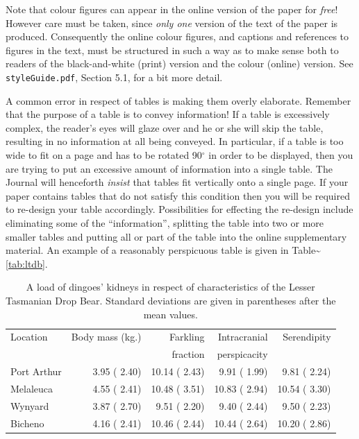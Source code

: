 \documentclass[
  times,
  doublespace]{anzsauth}
\begin{document}
Note that colour figures can appear in the online version of the paper
for \emph{free}! However care must be taken, since \emph{only one}
version of the text of the paper is produced. Consequently the online
colour figures, and captions and references to figures in the text, must
be structured in such a way as to make sense both to readers of the
black-and-white (print) version and the colour (online) version. See
\texttt{styleGuide.pdf}, Section 5.1, for a bit more detail.

A common error in respect of tables is making them overly elaborate.
Remember that the purpose of a table is to convey information! If a
table is excessively complex, the reader's eyes will glaze over and he
or she will skip the table, resulting in no information at all being
conveyed. In particular, if a table is too wide to fit on a page and has
to be rotated 90\(^\circ\) in order to be displayed, then you are trying
to put an excessive amount of information into a single table. The
Journal will henceforth \emph{insist} that tables fit vertically onto a
single page. If your paper contains tables that do not satisfy this
condition then you will be required to re-design your table accordingly.
Possibilities for effecting the re-design include eliminating some of
the ``information'', splitting the table into two or more smaller tables
and putting all or part of the table into the online supplementary
material. An example of a reasonably perspicuous table is given in
Table\textasciitilde{}\ref{tab:ltdb}.

\begin{table}[htp]
\caption{
A load of dingoes' kidneys in respect
of characteristics of the Lesser Tasmanian Drop Bear.  Standard
deviations are given in parentheses after the mean values.}
\centering
\begin{tabular}{|l|r|r|r|r|} \hline
Location & Body mass (kg.) & Farkling & Intracranial & Serendipity \\ 
         &                 & fraction & perspicacity &             \\ \hline
  Port Arthur &  3.95 ( 2.40) & 10.14 ( 2.43) &  9.91 ( 1.99) &  9.81 ( 2.24) \\ 
  Melaleuca   &  4.55 ( 2.41) & 10.48 ( 3.51) & 10.83 ( 2.94) & 10.54 ( 3.30) \\ 
  Wynyard     &  3.87 ( 2.70) &  9.51 ( 2.20) &  9.40 ( 2.44) &  9.50 ( 2.23) \\ 
  Bicheno     &  4.16 ( 2.41) & 10.46 ( 2.44) & 10.44 ( 2.64) & 10.20 ( 2.86) \\ 
   \hline
\end{tabular}
\end{table}
\end{document}
